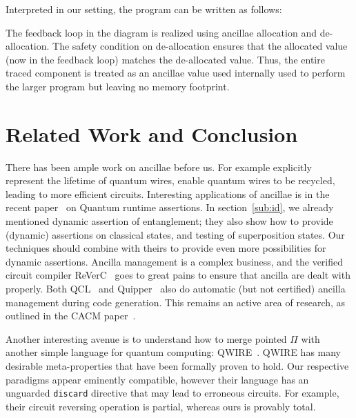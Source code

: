 \documentclass[sigplan,10pt,review,anonymous]{acmart}
\begin{document}
Interpreted in our setting, the program can be written as follows:

\PPFTtraceex{}

The feedback loop in the diagram is realized using ancillae allocation
and de-allocation. The safety condition on de-allocation ensures that
the allocated value (now in the feedback loop) matches the
de-allocated value. Thus, the entire traced component is treated as an
ancillae value used internally used to perform the larger program but
leaving no memory footprint.


\section{Related Work and Conclusion}

There has been ample work on ancillae before us.  For example
\cite{PhysRevA.94.042337} explicitly represent the lifetime of
quantum wires, enable quantum wires to be recycled, leading
to more efficient circuits.  Interesting applications of
ancillae is in the recent paper~\cite{DBLP:journals/cal/ZhouB19}
on Quantum runtime assertions.  In section~\ref{sub:id}, we
already mentioned dynamic assertion of entanglement; they
also show how to provide (dynamic) assertions on classical
states, and testing of superposition states.  Our techniques
should combine with theirs to provide even more possibilities
for dynamic assertions. Ancilla management is a complex
business, and the verified circuit compiler
ReVerC~\cite{amy2017verified} goes to great pains to
ensure that ancilla are dealt with properly.  Both
QCL~\cite{omer2002procedural} and Quipper~\cite{Green:2013:QSQ:2491956.2462177}
also do automatic (but not certified) ancilla management during code
generation.  This remains an active area of research, as
outlined in the CACM paper~\cite{valiron2015programming}.

Another interesting avenue is to understand how to merge
pointed $\Pi$ with another simple language for quantum
computing: QWIRE~\cite{Paykin:2017:QCL:3009837.3009894}.
QWIRE has many desirable meta-properties that have been
formally proven to hold.  Our respective paradigms appear eminently compatible,
however their language has an unguarded \texttt{discard} directive that
may lead to erroneous circuits. For example, their circuit
reversing operation is partial, whereas ours is provably total.
\end{document}

